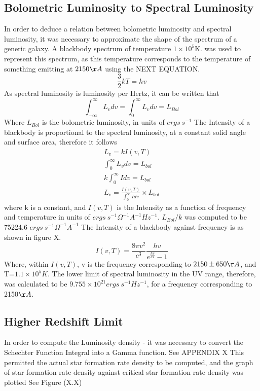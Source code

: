 \documentclass[pdf,color]{UoBnote}
\begin{document}
\subsection{Bolometric Luminosity to Spectral Luminosity}
In order to deduce a relation between bolometric luminosity and spectral luminosity, it was necessary to approximate the shape of the spectrum of a generic galaxy. A blackbody spectrum of temperature $1\times 10^5$K. was used to represent this spectrum, as this temperature corresponds to the temperature of something emitting at $2150\AA$ using the NEXT EQUATION.
\begin{equation}
\frac{3}{2}kT=hv
\end{equation}
\newline
As spectral luminosity is luminosity per Hertz, it can be written that
\begin{equation}
\int^{\infty}_{-\infty}L_v dv = \int^{\infty}_{0}L_v dv = L_{Bol}
\end{equation} 
Where $L_{Bol}$ is the bolometric luminosity, in units of $ergs \ s^{-1}$
The Intensity of a blackbody is proportional to the spectral luminosity, at a constant solid angle and surface area, therefore it follows 
\begin{eqnarray}
L_v= kI(v,T) \\
\int^{\infty}_{0}L_v dv=L_{bol} \\
k\int^{\infty}_{0}I dv=L_{bol} \\
L_v = \frac{I(v,T)}{\int^{\infty}_{0}I dv} \times L_{bol}
\end{eqnarray}
where k is a constant, and $I(v,T)$ is the Intensity as a function of frequency and temperature in units of $ergs \ s^{-1} \Omega^{-1} A^{-1} Hz^{-1}$. $L_{Bol}/k$ was computed to be 75224.6 $ergs \ s^{-1} \Omega^{-1} A^{-1}$ The Intensity of a blackbody against frequency is as shown in figure X.
\begin{equation}
I(v,T)=\frac{8\pi v^2}{c^3}\frac{hv}{e^\frac{hv}{kT}-1}
\end{equation}
Where, within $I(v,T)$, v is the frequency corresponding to $2150\pm 650 \AA$, and T=$1.1\times 10^5K$. The lower limit of spectral luminosity in the UV range, therefore, was calculated to be $9.755\times 10^{21} ergs \ s^{-1} Hz^{-1}$, for a frequency corresponding to 2150$\AA$.
\clearpage
\subsection{Higher Redshift Limit}
In order to compute the Luminosity density - it was necessary to convert the Schechter Function Integral into a Gamma function. See APPENDIX X
This permitted the actual star formation rate density to be computed, and the graph of star formation rate density against critical star formation rate density was plotted See Figure (X.X)
\end{document}
